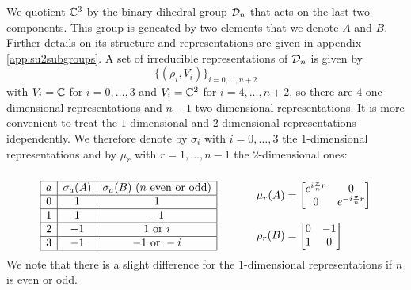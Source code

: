         We quotient $\mathbb{C}^3$ by the binary dihedral group $\mathcal{D}_n$ that acts on the last two components. This group is geneated by two elements that we denote $A$ and $B$. Firther details on its structure and representations are given in appendix \ref{app:su2subgroups}. A set of irreducible representations of $\mathcal{D}_n$ is given by
        \begin{equation}
            \{(\rho_i,V_i)\}_{i=0,\dots,n+2}
        \end{equation}
        with $V_i=\mathbb{C}$ for $i=0,\dots,3$ and $V_i=\mathbb{C}^2$ for $i=4,\dots,n+2$, so there are $4$ one-dimensional representations and $n-1$ two-dimensional representations. It is more convenient to treat the $1$-dimensional and $2$-dimensional representations idependently. We therefore denote by $\sigma_i$ with $i=0,\dots,3$ the $1$-dimensional representations and by $\mu_r$ with $r=1,\dots,n-1$ the $2$-dimensional ones:
        \begin{equation*}
        \begin{array}{cc}
            \multirow{7}{*}{$\begin{array}{|c|c|c|}
                \hline
                a & \sigma_a(A) & \sigma_a(B) \text{ ($n$ even or odd)} \\
                \hline
                0 & 1 & 1\\ \hline
                1 & 1 & -1 \\ \hline
                2 & -1 & 1 \text{ or } i \\ \hline
                3 & -1 & -1 \text{ or } -i \\
                \hline
            \end{array}$} & \\
            & {\hspace{0.9cm}\mu_r(A) = 
            \begin{bmatrix}
                e^{i\frac{\pi}{n}r} & 0\\
                0 & e^{-i\frac{\pi}{n}r} 
            \end{bmatrix}}\\
            & \\
            & {\rho_r(B) = 
            \begin{bmatrix}
                0 & -1 \\
                1 & 0
            \end{bmatrix}}
        \end{array}
        \end{equation*}
        We note that there is a slight difference for the $1$-dimensional representations if $n$ is even or odd.
        
